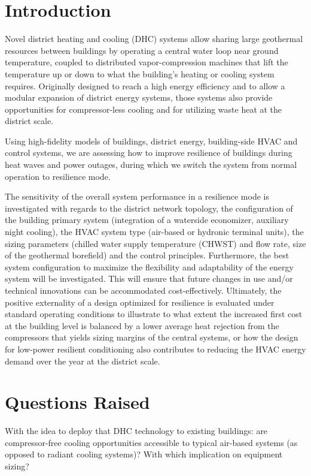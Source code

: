 \section{Introduction} \label{sec:intro}

Novel district heating and cooling (DHC) systems allow sharing large geothermal resources between buildings by operating a central water loop near ground temperature, coupled to distributed vapor-compression machines that lift the temperature up or down to what the building’s heating or cooling system requires.
Originally designed to reach a high energy efficiency and to allow a modular expansion of district energy systems, those systems also provide opportunities for compressor-less cooling and for utilizing waste heat at the district scale.

Using high-fidelity models of buildings, district energy, building-side HVAC and control systems, we are assessing how to improve resilience of buildings during heat waves and power outages, during which we switch the system from normal operation to resilience mode.

The sensitivity of the overall system performance in a resilience mode is investigated with regards to the district network topology, the configuration of the building primary system (integration of a waterside economizer, auxiliary night cooling), the HVAC system type (air-based or hydronic terminal units), the sizing parameters (chilled water supply temperature (CHWST) and flow rate, size of the geothermal borefield) and the control principles. Furthermore, the best system configuration to maximize the flexibility and adaptability of the energy system will be investigated. This will ensure that future changes in use and/or technical innovations can be accommodated cost-effectively.
Ultimately, the positive externality of a design optimized for resilience is evaluated under standard operating conditions to illustrate to what extent the increased first cost at the building level is balanced by a lower average heat rejection from the compressors that yields sizing margins of the central systems, or how the design for low-power resilient conditioning also contributes to reducing the HVAC energy demand over the year at the district scale.

\section{Questions Raised} \label{sec:questions}

With the idea to deploy that DHC technology to existing buildings: are compressor-free cooling opportunities accessible to typical air-based systems (as opposed to radiant cooling systems)? With which implication on equipment sizing?




